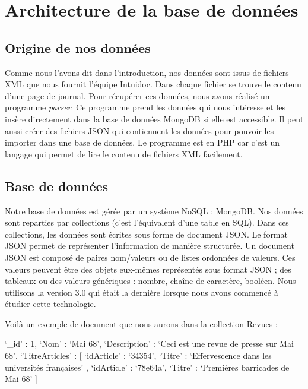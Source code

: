 \newpage
\section{Architecture de la base de données}
\label{sec:bdd}

\subsection{Origine de nos données}
\label{subsec:dataOrigin}

Comme nous l'avons dit dans l'introduction, nos données sont issus de fichiers XML que nous fournit l’équipe Intuidoc. Dans chaque fichier se trouve le contenu d'une page de journal. Pour récupérer ces données, nous avons réalisé un programme \textit{parser}. Ce programme prend les données qui nous intéresse et les insère directement dans la base de données MongoDB si elle est accessible. Il peut aussi créer des fichiers JSON qui contiennent les données pour pouvoir les importer dans une base de données. Le programme est en PHP car c'est un langage qui permet de lire le contenu de fichiers XML facilement.

\subsection{Base de données}
\label{subsec:mongo}

Notre base de données est gérée par un système NoSQL : MongoDB. Nos données sont reparties par collections (c’est l’équivalent d’une table en SQL). Dans ces collections, les données sont écrites sous forme de document JSON. Le format JSON permet de représenter l’information de manière structurée. Un document JSON est composé de paires nom/valeurs ou de listes ordonnées de valeurs. Ces valeurs peuvent être des objets eux-mêmes représentés sous format JSON ; des tableaux ou des valeurs génériques : nombre, chaîne de caractère, booléen. Nous utilisons la version 3.0 qui était la dernière lorsque nous avons commencé à étudier cette technologie.  


Voilà un exemple de document que nous aurons dans la collection Revues : 


\begin{verbatimtab}[3]
{
	‘_id’ : 1,
	‘Nom’ : ‘Mai 68’,
	‘Description’ : ‘Ceci est une revue de presse sur Mai 68’,
	‘TitreArticles’ : [ 
		{ ‘idArticle’ : ‘34354’, ‘Titre’ : ‘Effervescence dans les universités françaises’ },
		{ ‘idArticle’ : ‘78e64a’,  ‘Titre’ :	‘Premières barricades de Mai 68’ }
  ]
}
\end{verbatimtab}

